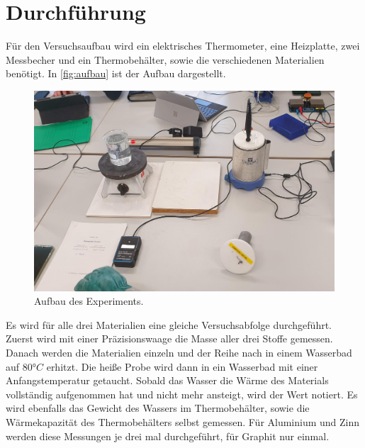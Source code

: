 \section{Durchführung}
\label{sec:Durchführung}

Für den Versuchsaufbau wird ein elektrisches Thermometer, eine Heizplatte, zwei Messbecher und ein Thermobehälter, sowie die verschiedenen Materialien benötigt.
In \autoref{fig:aufbau} ist der Aufbau dargestellt.

\begin{figure}[htbp]
    \centering
    \includegraphics[width=\textwidth]{content/Bilder/Aufbau.jpg}
    \caption{Aufbau des Experiments.}
    \label{fig:aufbau}
\end{figure}


Es wird für alle drei Materialien eine gleiche Versuchsabfolge durchgeführt.\\
Zuerst wird mit einer Präzisionswaage die Masse aller drei Stoffe gemessen.
Danach werden die Materialien einzeln und der Reihe nach in einem Wasserbad auf $80°C$ erhitzt.
Die heiße Probe wird dann in ein Wasserbad mit einer Anfangstemperatur getaucht.
Sobald das Wasser die Wärme des Materials vollständig aufgenommen hat und nicht mehr ansteigt, wird der Wert notiert.
Es wird ebenfalls das Gewicht des Wassers im Thermobehälter, sowie die Wärmekapazität des Thermobehälters selbst gemessen.
Für Aluminium und Zinn werden diese Messungen je drei mal durchgeführt, für Graphit nur einmal.